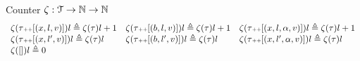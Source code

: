 %
%
Counter $\mathtt{\zeta} : \mathcal{T} \to \mathbb{N} \to \mathbb{N}$ 
\[
\begin{array}{lll}
\mathtt{\zeta}(\mathtt{\tau}  {\scriptscriptstyle ++} [(x, l, v)] ) l \triangleq \mathtt{\zeta}(\mathtt{\tau}) l + 1
&
\mathtt{\zeta}(\mathtt{\tau}  {\scriptscriptstyle ++} [(b, l, v)] ) l \triangleq \mathtt{\zeta}(\mathtt{\tau}) l + 1
&
\mathtt{\zeta}(\mathtt{\tau}  {\scriptscriptstyle ++} [(x, l, \alpha, v)] ) l \triangleq \mathtt{\zeta}(\mathtt{\tau}) l + 1
\\
\mathtt{\zeta}(\mathtt{\tau}  {\scriptscriptstyle ++} [(x, l', v)] ) l \triangleq \mathtt{\zeta}(\mathtt{\tau} ) l
&
\mathtt{\zeta}(\mathtt{\tau}  {\scriptscriptstyle ++} [(b, l', v)] ) l \triangleq \mathtt{\zeta}(\mathtt{\tau} ) l
&
\mathtt{\zeta}(\mathtt{\tau}  {\scriptscriptstyle ++} [(x, l', \alpha, v)]) l \triangleq \mathtt{\zeta}(\mathtt{\tau} ) l
\\
\mathtt{\zeta}({[]}) l \triangleq 0
&&
\end{array}
\]
